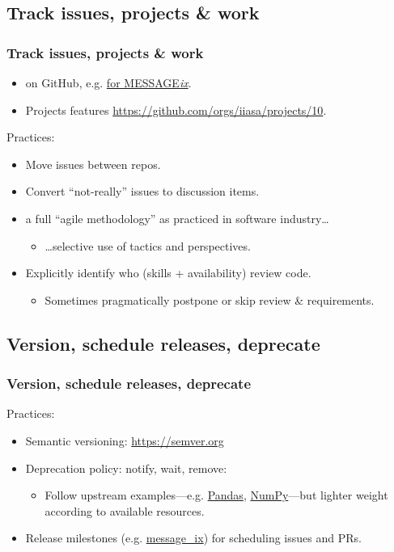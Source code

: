\documentclass[12pt,aspectratio=169]{beamer}
\begin{document}
\subsection{Track issues, projects \& work}
\begin{frame}
\frametitle{Track issues, projects \& work}

\begin{itemize}
  \item on GitHub, e.g. \href{https://github.com/iiasa/message_ix/issues}{for MESSAGE\emph{ix}}.
  \item Projects features \url{https://github.com/orgs/iiasa/projects/10}.
\end{itemize}

\medskip
Practices:
\begin{itemize}
  \item Move issues between repos.
  \item Convert “not-really” issues to discussion items.
  \item {} a full “agile methodology” as practiced in software industry…
    \begin{itemize}
      \item …selective use of tactics and perspectives.
    \end{itemize}
  \item Explicitly identify who  (skills + availability) review code.
    \begin{itemize}
      \item Sometimes pragmatically postpone or skip review \& requirements.
    \end{itemize}
\end{itemize}

\end{frame}

\subsection{Version, schedule releases, deprecate}
\begin{frame}
\frametitle{Version, schedule releases, deprecate}

\medskip
Practices:
\begin{itemize}
  \item Semantic versioning: \url{https://semver.org}
  \item Deprecation policy: notify, wait, remove:
    \begin{itemize}
      \item Follow upstream examples—e.g. \href{https://pandas.pydata.org/docs/development/policies.html\#policies-version}{Pandas}, \href{https://numpy.org/neps/nep-0023-backwards-compatibility.html}{NumPy}—but lighter weight according to available resources.
    \end{itemize}
  \item Release milestones (e.g. \href{https://github.com/iiasa/message_ix/milestones?state=closed}{\ttfamily message\_ix}) for scheduling issues and PRs.
\end{itemize}

\end{frame}
\end{document}
